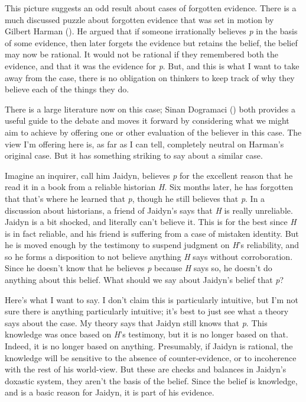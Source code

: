 \documentclass[
  10pt,
  letterpaper,
  twoside]{scrbook}
\begin{document}
This picture suggests an odd result about cases of forgotten evidence.
There is a much discussed puzzle about forgotten evidence that was set
in motion by Gilbert Harman (). He argued
that if someone irrationally believes \emph{p} in the basis of some
evidence, then later forgets the evidence but retains the belief, the
belief may now be rational. It would not be rational if they remembered
both the evidence, and that it was the evidence for \emph{p}. But, and
this is what I want to take away from the case, there is no obligation
on thinkers to keep track of why they believe each of the things they
do.

There is a large literature now on this case; Sinan Dogramaci
() both provides a useful guide to the
debate and moves it forward by considering what we might aim to achieve
by offering one or other evaluation of the believer in this case. The
view I'm offering here is, as far as I can tell, completely neutral on
Harman's original case. But it has something striking to say about a
similar case.

Imagine an inquirer, call him Jaidyn, believes \emph{p} for the
excellent reason that he read it in a book from a reliable historian
\emph{H}. Six months later, he has forgotten that that's where he
learned that \emph{p}, though he still believes that \emph{p}. In a
discussion about historians, a friend of Jaidyn's says that \emph{H} is
really unreliable. Jaidyn is a bit shocked, and literally can't believe
it. This is for the best since \emph{H} is in fact reliable, and his
friend is suffering from a case of mistaken identity. But he is moved
enough by the testimony to suspend judgment on \emph{H}'s reliability,
and so he forms a disposition to not believe anything \emph{H} says
without corroboration. Since he doesn't know that he believes \emph{p}
because \emph{H} says so, he doesn't do anything about this belief. What
should we say about Jaidyn's belief that \emph{p}?

Here's what I want to say. I don't claim this is particularly intuitive,
but I'm not sure there is anything particularly intuitive; it's best to
just see what a theory says about the case. My theory says that Jaidyn
still knows that \emph{p}. This knowledge was once based on \emph{H}'s
testimony, but it is no longer based on that. Indeed, it is no longer
based on anything. Presumably, if Jaidyn is rational, the knowledge will
be sensitive to the absence of counter-evidence, or to incoherence with
the rest of his world-view. But these are checks and balances in
Jaidyn's doxastic system, they aren't the basis of the belief. Since the
belief is knowledge, and is a basic reason for Jaidyn, it is part of his
evidence.
\end{document}
